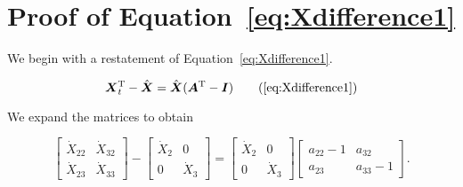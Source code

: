 %
%
%

\chapter{Proof of Equation~\ref{eq:Xdifference1}}
\label{app:Proof} 



We begin with a restatement of Equation~\ref{eq:Xdifference1}.

\begin{equation} \label{eq:Xdifference1Proof-1}
	\vec{X}_{t}^\mathrm{T} 
	- \hat{\vec{X}} 
	= \hat{\vec{X}}(\vec{A}^\mathrm{T} - \vec{I})
	\tag{\ref{eq:Xdifference1}}
\end{equation}

\noindent We expand the matrices to obtain

\begin{equation} \label{eq:Xdifference1Proof-2}
	\begin{bmatrix}
		\dot{X}_{22} & \dot{X}_{32}	\\
		\dot{X}_{23} & \dot{X}_{33}
	\end{bmatrix}
	-
	\begin{bmatrix}
		\dot{X}_{2} & 0	\\
		0           & \dot{X}_{3}
	\end{bmatrix}
	=
	\begin{bmatrix}
		\dot{X}_{2} & 0	\\
		0           & \dot{X}_{3}
	\end{bmatrix}
	\begin{bmatrix}
		a_{22}-1 & a_{32}	\\
		a_{23}   & a_{33}-1
	\end{bmatrix}.
\end{equation}

